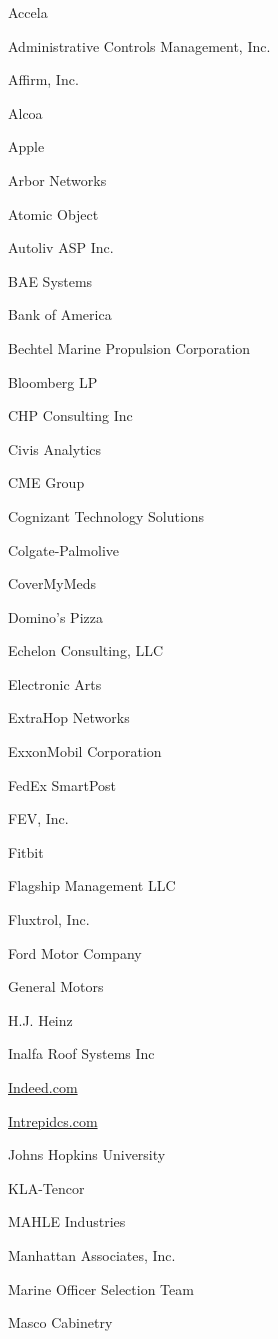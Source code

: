 \documentclass[twoside]{article}
\begin{document}
\begin{center}
\begin{multicols}{5}
\begin{FlushLeft}
        \begin{compactitem}
        \item Accela
\item Administrative Controls Management, Inc.
\item Affirm, Inc.
\item Alcoa
\item Apple
\item Arbor Networks
\item Atomic Object
\item Autoliv ASP Inc.
\item BAE Systems
\item Bank of America
\item Bechtel Marine Propulsion Corporation
\item Bloomberg LP
\item CHP Consulting Inc
\item Civis Analytics
\item CME Group
\item Cognizant Technology Solutions
\item Colgate-Palmolive
\item CoverMyMeds
\item Domino's Pizza
\item Echelon Consulting, LLC
\item Electronic Arts
\item ExtraHop Networks
\item ExxonMobil Corporation
\item FedEx SmartPost
\item FEV, Inc.
\item Fitbit
\item Flagship Management LLC
\item Fluxtrol, Inc.
\item Ford Motor Company
\item General Motors
\item H.J. Heinz
\item Inalfa Roof Systems Inc
\item \url{Indeed.com}
\item \url{Intrepidcs.com}
\item Johns Hopkins University
\item KLA-Tencor
\item MAHLE Industries
\item Manhattan Associates, Inc.
\item Marine Officer Selection Team
\item Masco Cabinetry

\end{compactitem}
\end{FlushLeft}
\end{multicols}
\end{center}
\end{document}
